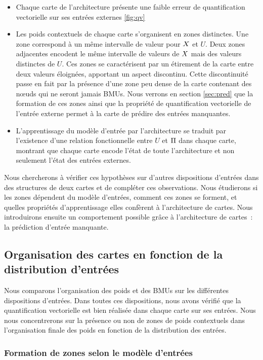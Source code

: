 \documentclass[../main]{subfiles}
\begin{document}
\begin{itemize}
	\item Chaque carte de l'architecture présente une faible erreur de quantification vectorielle sur ses entrées externes \ref{fig:qv}
	\item Les poids contextuels de chaque carte s'organisent en zones distinctes. Une zone correspond à un même intervalle de valeur pour $X$ et $U$. Deux zones adjacentes encodent le même intervalle de valeurs de $X$ mais des valeurs distinctes de $U$. Ces zones se caractérisent par un étirement de la carte entre deux valeurs éloignées, apportant un aspect discontinu. Cette discontinuité passe en fait par la présence d'une zone peu dense de la carte contenant des n\oe{}uds qui ne seront jamais BMUs. Nous verrons en section \ref{sec:pred} que la formation de ces zones ainsi que la propriété de quantification vectorielle de l'entrée externe permet à la carte de prédire des entrées manquantes.
	\item L'apprentissage du modèle d'entrée par l'architecture se traduit par l'existence d'une relation fonctionnelle entre $U$ et $\Pi$ dans chaque carte, montrant que chaque carte encode l'état de toute l'architecture et non seulement l'état des entrées externes.
\end{itemize}

Nous chercherons à vérifier ces hypothèses sur d'autres dispositions d'entrées dans des structures de deux cartes et de compléter ces observations.
Nous étudierons si les zones dépendent du modèle d'entrées, comment ces zones se forment, et quelles propriétés d'apprentissage elles confèrent à l'architecture de cartes.
Nous introduirons ensuite un comportement possible grâce à l'architecture de cartes~: la prédiction d'entrée manquante.

\subsection{Organisation des cartes en fonction de la distribution d'entrées}

Nous comparons l'organisation des poids et des BMUs sur les différentes dispositions d'entrées.
Dans toutes ces dispositions, nous avons vérifié que la quantification vectorielle est bien réalisée dans chaque carte sur ses entrées. Nous nous concentrerons sur la présence ou non de zones de poids contextuels dans l'organisation finale des poids en fonction de la distribution des entrées.

\subsubsection{Formation de zones selon le modèle d'entrées}
\end{document}
